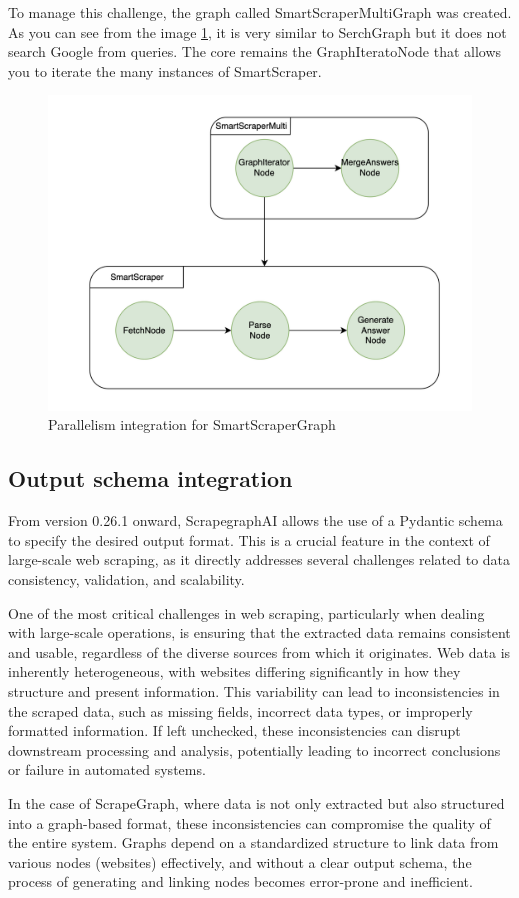 To manage this challenge, the graph called SmartScraperMultiGraph was created.
As you can see from the image \ref{fig:multi}, it is very similar to SerchGraph but it does not search Google from queries.
The core remains the GraphIteratoNode that allows you to iterate the many instances of SmartScraper.
\begin{figure}[H]
    \centering
    \includegraphics[width=0.75\linewidth]{Assets/multi_graph.png}
    \caption{Parallelism integration for SmartScraperGraph}
    \label{fig:multi}
\end{figure}


\subsection{Output schema integration}
From version 0.26.1 onward, ScrapegraphAI allows the use of a Pydantic schema to specify the desired output format. This is a crucial feature in the context of large-scale web scraping, as it directly addresses several challenges related to data consistency, validation, and scalability.

One of the most critical challenges in web scraping, particularly when dealing with large-scale operations, is ensuring that the extracted data remains consistent and usable, regardless of the diverse sources from which it originates. Web data is inherently heterogeneous, with websites differing significantly in how they structure and present information. This variability can lead to inconsistencies in the scraped data, such as missing fields, incorrect data types, or improperly formatted information. If left unchecked, these inconsistencies can disrupt downstream processing and analysis, potentially leading to incorrect conclusions or failure in automated systems.

In the case of ScrapeGraph, where data is not only extracted but also structured into a graph-based format, these inconsistencies can compromise the quality of the entire system. Graphs depend on a standardized structure to link data from various nodes (websites) effectively, and without a clear output schema, the process of generating and linking nodes becomes error-prone and inefficient.

